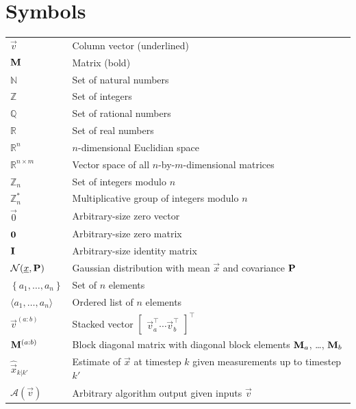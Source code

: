 \documentclass[oneside]{scrbook}
\theoremstyle{definition}
\theoremstyle{definition}
\theoremstyle{remark}
\begin{document}
\section*{Symbols}
\begin{longtable}{p{}p{}}
    $\vec{v}$ & Column vector (underlined)\\
    ${{\mathbf{M}}}$ & Matrix (bold)\\
    $\mathbb{N}$ & Set of natural numbers\\
    $\mathbb{Z}$ & Set of integers\\
    $\mathbb{Q}$ & Set of rational numbers\\
    $\mathbb{R}$ & Set of real numbers\\
    $\mathbb{R}^n$ & $n$-dimensional Euclidian space\\
    $\mathbb{R}^{n\times m}$ & Vector space of all $n$-by-$m$-dimensional matrices\\
    $\mathbb{Z}_n$ & Set of integers modulo $n$\\
    $\mathbb{Z}_n^*$ & Multiplicative group of integers modulo $n$\\
    $\vec{0}$ & Arbitrary-size zero vector\\
    ${{\mathbf{0}}}$ & Arbitrary-size zero matrix\\
    ${{\mathbf{I}}}$ & Arbitrary-size identity matrix\\
    $\mathcal{N}({\underline{x}},{{\mathbf{P}}})$ & Gaussian distribution with mean $\vec{x}$ and covariance ${{\mathbf{P}}}$\\
    $\left\{a_1,\dots,a_n\right\}$ & Set of $n$ elements\\
    $\langle a_1,\dots,a_n\rangle$ & Ordered list of $n$ elements\\
    $\vec{v}^{(a:b)}$ & Stacked vector $\begin{bmatrix}\vec{v}^\top_a \cdots \vec{v}^\top_b\end{bmatrix}^\top$\\
    ${{\mathbf{M}}}^{(a:b)}$ & Block diagonal matrix with diagonal block elements ${{\mathbf{M}}}_a$, \dots, ${{\mathbf{M}}}_b$\\
    $\hat{\vec{x}}_{k|k'}$ & Estimate of $\vec{x}$ at timestep $k$ given measurements up to timestep $k'$\\
    $\mathcal{A}(\vec{v})$ & Arbitrary algorithm output given inputs $\vec{v}$
\end{longtable}
\end{document}
